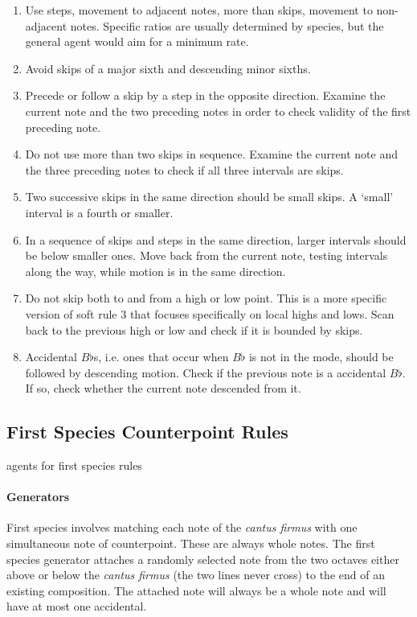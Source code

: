 	\begin{enumerate}
		\item Use steps, movement to adjacent notes, more than skips, movement to non-adjacent notes. Specific ratios are usually determined by species, but the general agent would aim for a minimum rate.
		
		\item Avoid skips of a major sixth and descending minor sixths.

		\item Precede or follow a skip by a step in the opposite direction. Examine the current note and the two preceding notes in order to check validity of the first preceding note.

		\item Do not use more than two skips in sequence. Examine the current note and the three preceding notes to check if all three intervals are skips.

		\item Two successive skips in the same direction should be small skips. A `small' interval is a fourth or smaller.

		\item In a sequence of skips and steps in the same direction, larger intervals should be below smaller ones.
					Move back from the current note, testing intervals along the way, while motion is in the same direction.

		\item Do not skip both to and from a high or low point. This is a more specific version of soft rule 3 that focuses specifically on local highs and lows.
					Scan back to the previous high or low and check if it is bounded by skips.

		\item Accidental $B\flat$s, i.e. ones that occur when $B\flat$ is not in the mode, should be followed by descending motion.
					Check if the previous note is a accidental $B\flat$. If so, check whether the current note descended from it.

	\end{enumerate}

\subsection{First Species Counterpoint Rules}

agents for first species rules

\paragraph{Generators}
First species involves matching each note of the \emph{cantus firmus} with one simultaneous note of counterpoint. These are always whole notes.
The first species generator attaches a randomly selected note from the two octaves either above or below the \emph{cantus firmus} (the two lines never cross) to the end of an existing composition.
The attached note will always be a whole note and will have at most one accidental.
